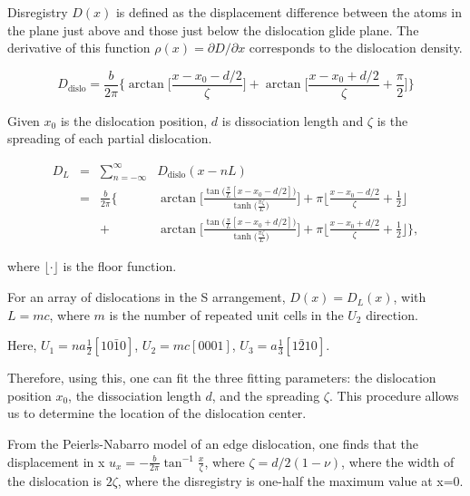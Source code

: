 \documentclass[11pt]{article}
\begin{document}
Disregistry \(D(x)\) is defined as the displacement difference
between the atoms in the plane just above and those just below the
dislocation glide plane. The derivative of this function \(\rho(x) = \partial
     D / \partial x\) corresponds to the dislocation density.


\[
     D_{\text{dislo}} = \frac{b}{2\pi} 
     \Bigg\{ \arctan \bigg[  \frac{x - x_0 - d/2}{ \zeta } \bigg] +
            \arctan \bigg[  \frac{x - x_0 + d/2}{ \zeta } + \frac{\pi}{2} \bigg]
	    \Bigg\}
     \]

Given \(x_0\) is the dislocation position, \(d\) is dissociation
length and \(\zeta\) is the spreading of each partial dislocation. 

\begin{align*}
  D_{L} &= &\sum_{n = -\infty}^{\infty}  &D_{\text{dislo}} (x - nL) \\
     &= &\frac{ b }{ 2\pi } 
        \Bigg \{ 
         &\arctan \bigg[ 
            \frac{ 
                  \tan \big( \frac{\pi}{L} [x - x_0 - d/2] \big)
                 }{ 
                 \tanh \big( \frac{\pi\zeta}{L} \big)
                  } \bigg]
       + \pi\bigg\lfloor 
       	 \frac{x - x_0 - d/2}{ \zeta } + \frac{1}{2}
       \bigg\rfloor \\
   & &+
         &\arctan \bigg[ 
            \frac{ 
                  \tan \big( \frac{\pi}{L} [x - x_0 + d/2] \big)
                 }{ 
                 \tanh \big( \frac{\pi\zeta}{L} \big)
                  } \bigg]
       + \pi \bigg\lfloor 
       	 \frac{x - x_0 + d/2}{ \zeta } + \frac{1}{2}
       \bigg\rfloor    \Bigg\},
\end{align*}

where \(\lfloor \cdot \rfloor\) is the floor function. 

For an array of dislocations in the S arrangement, \(D(x) = D_L(x)\),
with \(L = mc\), where \(m\) is the number of repeated unit cells in
the \(U_2\) direction. 

Here, \(U_1 = na \frac{1}{2} [10\bar{1}0]\), \(U_2 = mc [0001]\), 
\(U_3 =  a \frac{1}{3} [1\bar{2}10]\).

Therefore, using this, one can fit the three fitting parameters:
the dislocation position \(x_0\), the dissociation length \(d\), and the
spreading \(\zeta\). This procedure allows us to determine the
location of the dislocation center.

From the Peierls-Nabarro model of an edge dislocation, one finds
that the displacement in x \(u_x = -\frac{b}{2\pi} \tan^{-1}
     \frac{x}{\zeta}\), where \(\zeta = d/2(1-\nu)\), where the width of
the dislocation is \(2\zeta\), where the disregistry is one-half the
maximum value at x=0.
\end{document}
